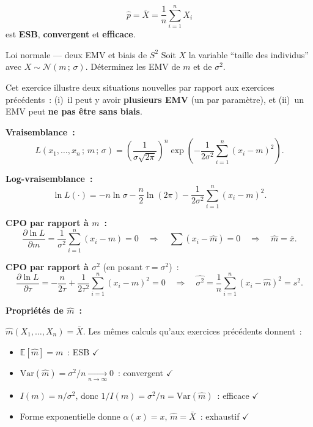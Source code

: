 \documentclass[11pt,a4paper]{article}
\newcommand{\N}{\mathcal{N}}
\newcommand{\E}{\mathbb{E}}
\newcommand{\Var}{\mathrm{Var}}
\newcommand{\corrsep}{\vspace{4pt}{\color{rulecol}\hrule height 0.6pt}\vspace{6pt}}
\begin{document}
\begin{methbox}
$$\boxed{\hat p = \bar X = \frac{1}{n}\sum_{i=1}^n X_i}$$
est \textbf{ESB}, \textbf{convergent} et \textbf{efficace}.
\end{methbox}

\begin{exercice}{Loi normale --- deux EMV et biais de $S^2$}
Soit $X$ la variable ``taille des individus'' avec $X\sim\N(m\,;\,\sigma)$.
D\'eterminez les EMV de $m$ et de $\sigma^2$.
\end{exercice}

\corrsep

\begin{alertbox}
Cet exercice illustre deux situations nouvelles par rapport aux exercices pr\'ec\'edents~: (i)~il peut y avoir \textbf{plusieurs EMV} (un par param\`etre), et (ii)~un EMV peut \textbf{ne pas \^etre sans biais}.
\end{alertbox}

\textbf{Vraisemblance~:}
$$L(x_1,\ldots,x_n\,;\,m\,;\,\sigma)
  = \left(\frac{1}{\sigma\sqrt{2\pi}}\right)^n
    \exp\!\left(-\frac{1}{2\sigma^2}\sum_{i=1}^n(x_i-m)^2\right).$$

\textbf{Log-vraisemblance~:}
$$\ln L(\cdot) = -n\ln\sigma - \frac{n}{2}\ln(2\pi)
  - \frac{1}{2\sigma^2}\sum_{i=1}^n(x_i-m)^2.$$

\medskip
\textbf{CPO par rapport \`a $m$~:}
$$\frac{\partial\ln L}{\partial m}
  = \frac{1}{\sigma^2}\sum_{i=1}^n(x_i-m) = 0
  \quad\Longrightarrow\quad \sum(x_i-\hat m)=0
  \quad\Longrightarrow\quad \boxed{\hat m = \bar x.}$$

\textbf{CPO par rapport \`a $\sigma^2$} (en posant $\tau=\sigma^2$)~:
$$\frac{\partial\ln L}{\partial\tau}
  = -\frac{n}{2\tau}+\frac{1}{2\tau^2}\sum_{i=1}^n(x_i-m)^2 = 0
  \quad\Longrightarrow\quad \boxed{\widehat{\sigma^2} = \frac{1}{n}\sum_{i=1}^n(x_i-\hat m)^2 = s^2.}$$

\textbf{Propri\'et\'es de $\hat m$~:}

$\hat m(X_1,\ldots,X_n) = \bar X$. Les m\^emes calculs qu'aux exercices pr\'ec\'edents donnent~:
\begin{itemize}
  \item $\E[\hat m]=m$~: ESB $\checkmark$
  \item $\Var(\hat m)=\sigma^2/n \xrightarrow[n\to\infty]{} 0$~: convergent $\checkmark$
  \item $I(m)=n/\sigma^2$, donc $1/I(m)=\sigma^2/n=\Var(\hat m)$~: efficace $\checkmark$
  \item Forme exponentielle donne $\alpha(x)=x$, $\hat m=\bar X$~: exhaustif $\checkmark$
\end{itemize}
\end{document}

